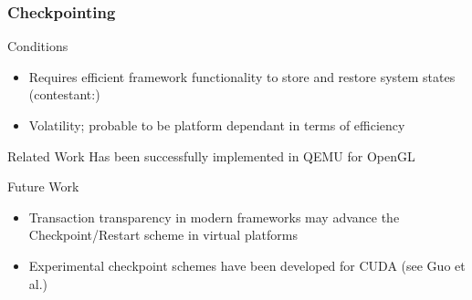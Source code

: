 
\begin{frame}

\frametitle{Checkpointing}

\begin{block}{Conditions}
	\begin{itemize}
		\item Requires efficient framework functionality to store and restore system states (contestant:)
		\item Volatility; probable to be platform dependant in terms of efficiency
	\end{itemize}
\end{block}

\begin{block}{Related Work}
	Has been successfully implemented in QEMU for OpenGL
\end{block}

\begin{block}{Future Work}
	\begin{itemize}
		\item Transaction transparency in modern frameworks may advance the Checkpoint/Restart scheme in virtual platforms
		\item Experimental checkpoint schemes have been developed for CUDA (see Guo et al.)
	\end{itemize}
\end{block}

\end{frame}
